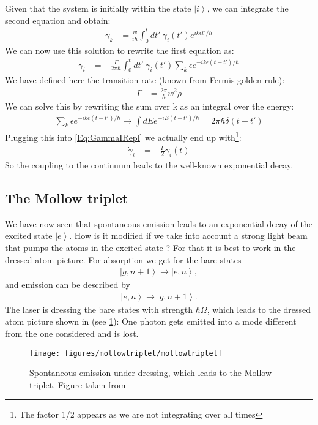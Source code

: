 \documentclass[10pt]{article}
\let\cite\citep
\providecommand\citep{\cite}
\newcommand{\ket}[1]{\ensuremath{\left|#1\right\rangle}}
\begin{document}
Given that the system is initially within the state $\ket{i}$, we can integrate the second equation and obtain:
\begin{align}
\gamma_k &= \frac{w}{i\hbar} \int_0^t dt'~\gamma_i(t') e^{ik\epsilon t'/\hbar}
\end{align}
We can now use this solution to rewrite the first equation as:
\begin{align}\label{Eq:GammaIRepl}
\dot{\gamma}_i &= -\frac{\Gamma}{2\pi\hbar}\int_0^t dt'~\gamma_i(t') \sum_k \epsilon e^{-ik\epsilon (t-t')/\hbar}
\end{align}
We have defined here the transition rate (known from Fermis golden rule):
\begin{align}
\Gamma &= \frac{2\pi}{\hbar}w^2\rho
\end{align}
We can solve this by rewriting the sum over k as an integral over the energy:
\begin{align}
\sum_k \epsilon e^{-ik\epsilon (t-t')/\hbar}\rightarrow \int dE e^{-iE (t-t')/\hbar} = 2\pi \hbar \delta(t-t')
\end{align}
Plugging this into \eqref{Eq:GammaIRepl} we actually end up with\footnote{The factor 1/2 appears as we are not integrating over all times}:
\begin{align}\label{Eq:GammaIRepl}
\dot{\gamma}_i &= -\frac{\Gamma}{2}\gamma_i(t)
\end{align}
So the coupling to the continuum leads to the well-known exponential decay.



\subsection{The Mollow triplet}

We have now seen that spontaneous emission leads to an exponential decay of the excited state $\ket{e}$. How is it modified if we take into account a strong light beam that pumps the atoms in the excited state ? For that it is best to work in the dressed atom picture. For absorption we get for the bare states
\begin{align}
\ket{g,n+1} \rightarrow \ket{e,n},
\end{align}
and emission can be described by
\begin{align} \label{eq:barestatesemission}
\ket{e,n} \rightarrow \ket{g,n+1}.
\end{align}
The laser is dressing the bare states with strength $\hbar \Omega$, which leads to the dressed atom picture shown in (see \ref{786304}): One photon gets emitted into a mode different from the one considered and is lost.
\begin{figure}[h!]
\begin{center}
\texttt{[image: figures/mollowtriplet/mollowtriplet]}
\caption{{Spontaneous emission under dressing, which leads to the Mollow triplet.
Figure taken from \protect\cite{Cohen_Tannoudji_1998}
{\label{786304}}%
}}
\end{center}
\end{figure}
\end{document}
